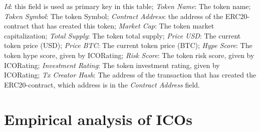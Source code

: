 \begin{outline}
        \2 \textit{Id}: this field is used as primary key in this table;
        \2 \textit{Token Name}: The token name;
        \2 \textit{Token Symbol}: The token Symbol;
        \2 \textit{Contract Address}: the address of the ERC20-contract that has created this token;
        \2 \textit{Market Cap}: The token market capitalization;
        \2 \textit{Total Supply}: The token total supply;
        \2 \textit{Price USD}: The current token price (USD);
        \2 \textit{Price BTC}: The current token price (BTC);
        \2 \textit{Hype Score}: The token hype score, given by ICORating;
        \2 \textit{Risk Score}: The token risk score, given by ICORating;
        \2 \textit{Investment Rating}: The token investment rating, given by ICORating;
        \2 \textit{Tx Creator Hash}: The address of the transaction that has created the ERC20-contract, which address is in the \textit{Contract Address} field.
\end{outline}

\section{Empirical analysis of ICOs}